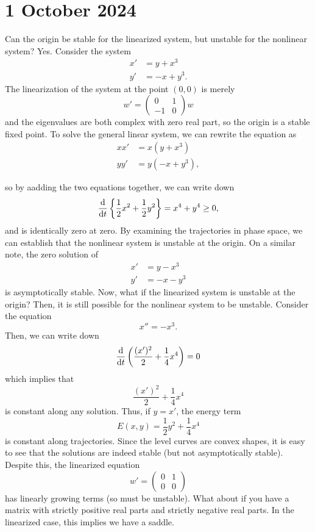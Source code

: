 \documentclass{article}
\begin{document}
\section*{1 October 2024}
    Can the origin be stable for the linearized system, but unstable for the nonlinear system? Yes. Consider the system 
    \begin{align*}
        x' &= y + x^3\\
        y' &= -x + y^3.
    \end{align*}
    The linearization of the system at the point $(0, 0)$ is merely 
    \[
        w' = \begin{pmatrix} 0 & 1 \\ -1 & 0 \end{pmatrix} w
    \]
    and the eigenvalues are both complex with zero real part, so the origin is a stable fixed point. To solve the general linear system, we can rewrite the equation as 
    \begin{align*}
        xx' &= x(y + x^3)\\
        yy' &= y(-x + y^3),
    \end{align*}

    so by aadding the two equations together, we can write down 
    \[
        \dv{t} \left\{\frac{1}{2} x^2 + \frac{1}{2} y^2\right\} = x^4 + y^4 \geq 0,
    \]
    and is identically zero at zero. By examining the trajectories in phase space, we can establish that the nonlinear system is unstable at the origin. On a similar note, the zero solution of 
    \begin{align*}
        x' &= y - x^3\\
        y' &= -x - y^3
    \end{align*} 
    is asymptotically stable. Now, what if the linearized system is unstable at the origin? Then, it is still possible for the nonlinear system to be unstable. Consider the equation 
    \[
        x'' = -x^3.
    \]
    Then, we can write down 
    \[
        \dv{t} \left(\frac{(x')^2}{2} + \frac{1}{4} x^4\right) = 0
    \]  
    which implies that 
    \[
        \frac{(x')^2}{2} + \frac{1}{4} x^4 
    \]
    is constant along any solution. Thus, if $y= x'$, the energy term 
    \[
        E(x, y) = \frac{1}{2} y^2 + \frac{1}{4} x^4
    \] 
    is constant along trajectories. Since the level curves are convex shapes, it is easy to see that the solutions are indeed stable (but not asymptotically stable). Despite this, the linearized equation 
    \[
        w' = \begin{pmatrix} 0 & 1 \\ 0 & 0 \end{pmatrix}
    \]
    has linearly growing terms (so must be unstable). What about if you have a matrix with strictly positive real parts and strictly negative real parts. In the linearized case, this implies we have a saddle. 
    \newpar
\end{document}
